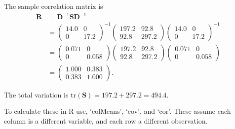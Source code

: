 \documentclass[]{book}
\newenvironment{Shaded}{\begin{snugshade}}{\end{snugshade}}
\newcommand{\DataTypeTok}[1]{\textcolor[rgb]{0.13,0.29,0.53}{#1}}
\newcommand{\DecValTok}[1]{\textcolor[rgb]{0.00,0.00,0.81}{#1}}
\newcommand{\KeywordTok}[1]{\textcolor[rgb]{0.13,0.29,0.53}{\textbf{#1}}}
\newcommand{\NormalTok}[1]{#1}
\newcommand{\OperatorTok}[1]{\textcolor[rgb]{0.81,0.36,0.00}{\textbf{#1}}}
\newcommand{\StringTok}[1]{\textcolor[rgb]{0.31,0.60,0.02}{#1}}
\theoremstyle{definition}
\theoremstyle{definition}
\theoremstyle{definition}
\theoremstyle{remark}
\begin{document}
The sample correlation matrix is
\begin{align*}
\boldsymbol R&= \boldsymbol D^{-1} \boldsymbol S\boldsymbol D^{-1}\\
&= \begin{pmatrix} 14.0 & 0 \\ 0 & 17.2 \end{pmatrix}^{-1} \begin{pmatrix} 197.2 & 92.8 \\ 92.8 & 297.2 \end{pmatrix} \begin{pmatrix} 14.0 & 0 \\ 0 & 17.2 \end{pmatrix}^{-1} \\
&= \begin{pmatrix} 0.071 & 0 \\ 0 & 0.058 \end{pmatrix} \begin{pmatrix} 197.2 & 92.8 \\ 92.8 & 297.2 \end{pmatrix} \begin{pmatrix} 0.071 & 0 \\ 0 & 0.058 \end{pmatrix} \\
&= \begin{pmatrix} 1.000 & 0.383 \\ 0.383 & 1.000 \end{pmatrix}.
\end{align*}

The total variation is \(\text{tr}(\boldsymbol S) = 197.2 + 297.2 = 494.4\).

To calculate these in R use, `colMeans', `cov', and `cor'. These assume each column is a different variable, and each row a different observation.

\begin{Shaded}
\end{Shaded}
\end{document}
